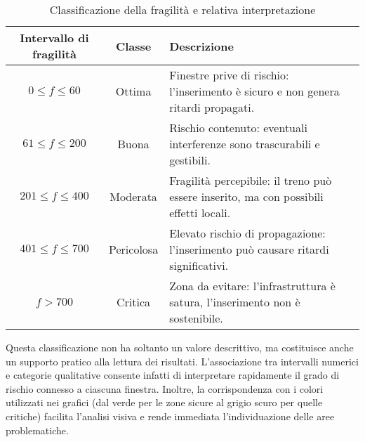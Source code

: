 \documentclass{report}
\begin{document}
\begin{table}[h!]
    \centering
    \begin{tabular}{|c|c|p{5cm}|}
        \hline
        \textbf{Intervallo di fragilità} & \textbf{Classe} & \textbf{Descrizione} \\
        \hline
        $0 \leq f \leq 60$   & Ottima     & Finestre prive di rischio: l'inserimento è sicuro e non genera ritardi propagati. \\
        \hline
        $61 \leq f \leq 200$ & Buona      & Rischio contenuto: eventuali interferenze sono trascurabili e gestibili. \\
        \hline
        $201 \leq f \leq 400$ & Moderata   & Fragilità percepibile: il treno può essere inserito, ma con possibili effetti locali. \\
        \hline
        $401 \leq f \leq 700$ & Pericolosa & Elevato rischio di propagazione: l’inserimento può causare ritardi significativi. \\
        \hline
        $f > 700$             & Critica    & Zona da evitare: l'infrastruttura è satura, l’inserimento non è sostenibile. \\
        \hline
    \end{tabular}
    \caption{Classificazione della fragilità e relativa interpretazione}
    \label{tab:fragilita}
\end{table} 
Questa classificazione non ha soltanto un valore descrittivo, ma costituisce anche un supporto pratico alla lettura dei risultati. L’associazione tra intervalli numerici e categorie qualitative consente infatti di interpretare rapidamente il grado di rischio connesso a ciascuna finestra. Inoltre, la corrispondenza con i colori utilizzati nei grafici (dal verde per le zone sicure al grigio scuro per quelle critiche) facilita l’analisi visiva e rende immediata l’individuazione delle aree problematiche.
\end{document}
